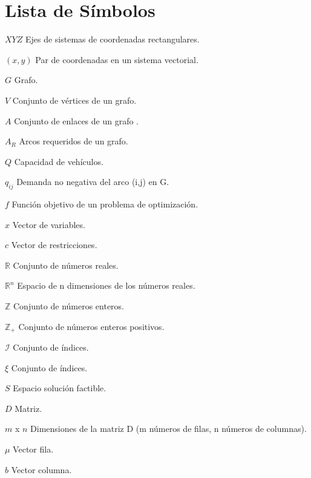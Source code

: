 \chapter*{Lista de Símbolos\hfill}

\begin{abbreviations}

    \item[$XYZ$] Ejes de sistemas de coordenadas rectangulares.
    \item[$(x, y)$] Par de coordenadas en un sistema vectorial.
    \item[$G$] Grafo.
    \item[$V$] Conjunto de vértices de un grafo.
    \item[$A$] Conjunto de enlaces de un grafo .
    \item[$A_R$] Arcos requeridos de un grafo.
    
    \item[$Q$] Capacidad de vehículos.
    \item[$q_{ij}$] Demanda no negativa del arco (i,j) en G.
    
    \item[$f$] Función objetivo de un problema de optimización.
    \item[$x$] Vector de variables.
    \item[$c$] Vector de restricciones.
    
    \item[$\mathbb{R}$] Conjunto de números reales.
    \item[$\mathbb{R}^n$] Espacio de n dimensiones de los números reales.
    \item[$\mathbb{Z}$] Conjunto de números enteros.
    \item[$\mathbb{Z}_{+}$] Conjunto de números enteros positivos.
    
    \item[$\mathcal{I}$] Conjunto de índices.
    \item[$\xi$] Conjunto de índices.
    
    \item[${S}$] Espacio solución factible.
    \item[$D$] Matriz.
    \item[$m$ x $n$] Dimensiones de la matriz D (m números de filas, n números de
    columnas).
    \item[$\mu$] Vector fila.
    \item[$b$] Vector columna.
    

\end{abbreviations}
